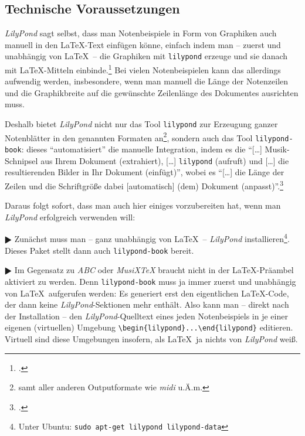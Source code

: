 \subsection{Technische Voraussetzungen}

\textit{LilyPond} sagt selbst, dass man Notenbeispiele in Form von Graphiken auch
manuell in den \LaTeX-Text einfügen könne, einfach indem man -- zuerst und
unabhängig von \LaTeX\ -- die Graphiken mit \texttt{lilypond} erzeuge und sie
danach mit \LaTeX-Mitteln einbinde.\footcite[vgl.][20]{LilyPond2018e} Bei vielen
Notenbeispielen kann das allerdings aufwendig werden, insbesondere, wenn man
manuell die Länge der Notenzeilen und die Graphikbreite auf die gewünschte
Zeilenlänge des Dokumentes ausrichten muss.

Deshalb bietet \textit{LilyPond} nicht nur das Tool \texttt{lilypond} zur
Erzeugung ganzer Notenblätter in den genannten Formaten an\footnote{samt aller
anderen Outputformate wie \textit{midi} u.Ä.m.}, sondern auch das Tool
\texttt{lilypond-book}: dieses \enquote{automatisiert} die manuelle Integration,
indem es die \enquote{[\ldots] Musik-Schnipsel aus Ihrem Dokument (extrahiert),
[\ldots] \texttt{lilypond} (aufruft) und [\ldots] die resultierenden Bilder in
Ihr Dokument (einfügt)}, wobei es \enquote{[\ldots] die Länge der Zeilen und die
Schriftgröße dabei [automatisch] (dem) Dokument
(anpasst)}.\footcite[vgl.][20]{LilyPond2018e}

Daraus folgt sofort, dass man auch hier einiges vorzubereiten hat, wenn man
\textit{LilyPond} erfolgreich verwenden will:

$\RHD$ Zunächst muss man -- ganz unabhängig von \LaTeX\ -- \textit{LilyPond}
installieren\footnote{Unter Ubuntu: \texttt{sudo apt-get lilypond
lilypond-data}}. Dieses Paket stellt dann auch \texttt{lilypond-book} bereit.
  
$\RHD$ Im Gegensatz zu \textit{ABC} oder \textit{MusiX\TeX} braucht
 nicht in der \LaTeX-Präambel aktiviert zu werden. Denn
\texttt{lilypond-book} muss ja immer zuerst und unabhängig von \LaTeX\
aufgerufen werden: Es generiert erst den eigentlichen \LaTeX-Code, der dann
keine \textit{LilyPond}-Sektionen mehr enthält. Also kann man -- direkt nach der
Installation -- den \textit{LilyPond}-Quelltext eines jeden Notenbeispiels in je
einer eigenen (virtuellen) Umgebung \verb|\begin{lilypond}...\end{lilypond}|
editieren. Virtuell sind diese Umgebungen insofern, als \LaTeX\ ja nichts von
\textit{LilyPond} weiß.


